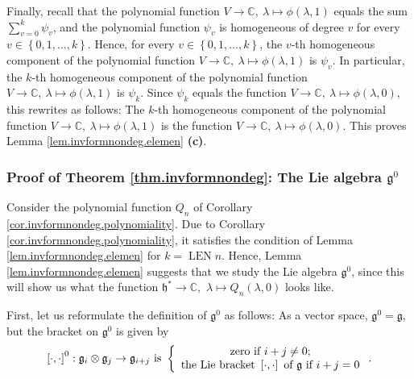 \documentclass
[numbers=enddot,12pt,final,onecolumn,german,notitlepage]{scrartcl}%
\theoremstyle{definition}
\begin{document}
Finally, recall that the polynomial function $V\rightarrow\mathbb{C}%
,\ \lambda\mapsto\phi\left(  \lambda,1\right)  $ equals the sum $\sum
\limits_{v=0}^{k}\psi_{v}$, and the polynomial function $\psi_{v}$ is
homogeneous of degree $v$ for every $v\in\left\{  0,1,...,k\right\}  $. Hence,
for every $v\in\left\{  0,1,...,k\right\}  $, the $v$-th homogeneous component
of the polynomial function $V\rightarrow\mathbb{C},\ \lambda\mapsto\phi\left(
\lambda,1\right)  $ is $\psi_{v}$. In particular, the $k$-th homogeneous
component of the polynomial function $V\rightarrow\mathbb{C},\ \lambda
\mapsto\phi\left(  \lambda,1\right)  $ is $\psi_{k}$. Since $\psi_{k}$ equals
the function $V\rightarrow\mathbb{C},\ \lambda\mapsto\phi\left(
\lambda,0\right)  $, this rewrites as follows: The $k$-th homogeneous
component of the polynomial function $V\rightarrow\mathbb{C},\ \lambda
\mapsto\phi\left(  \lambda,1\right)  $ is the function $V\rightarrow
\mathbb{C},\ \lambda\mapsto\phi\left(  \lambda,0\right)  $. This proves Lemma
\ref{lem.invformnondeg.elemen} \textbf{(c)}.

\subsubsection{Proof of Theorem \ref{thm.invformnondeg}: The Lie algebra
$\mathfrak{g}^{0}$}

Consider the polynomial function $Q_{n}$ of Corollary
\ref{cor.invformnondeg.polynomiality}. Due to Corollary
\ref{cor.invformnondeg.polynomiality}, it satisfies the condition of Lemma
\ref{lem.invformnondeg.elemen} for $k=\operatorname*{LEN}n$. Hence, Lemma
\ref{lem.invformnondeg.elemen} suggests that we study the Lie algebra
$\mathfrak{g}^{0}$, since this will show us what the function $\mathfrak{h}%
^{\ast}\rightarrow\mathbb{C},$ $\lambda\mapsto Q_{n}\left(  \lambda,0\right)
$ looks like.

First, let us reformulate the definition of $\mathfrak{g}^{0}$ as follows: As
a vector space, $\mathfrak{g}^{0}=\mathfrak{g}$, but the bracket on
$\mathfrak{g}^{0}$ is given by%
\begin{equation}
\left[  \cdot,\cdot\right]  ^{0}:\mathfrak{g}_{i}\otimes\mathfrak{g}%
_{j}\rightarrow\mathfrak{g}_{i+j}\text{ }\text{is }\left\{
\begin{array}
[c]{c}%
\text{zero if }i+j\neq0\text{;}\\
\text{the Lie bracket }\left[  \cdot,\cdot\right]  \text{ of }\mathfrak{g}%
\text{ if }i+j=0
\end{array}
\right.  . \label{prop.det.US.pf.-1}%
\end{equation}
\end{document}
